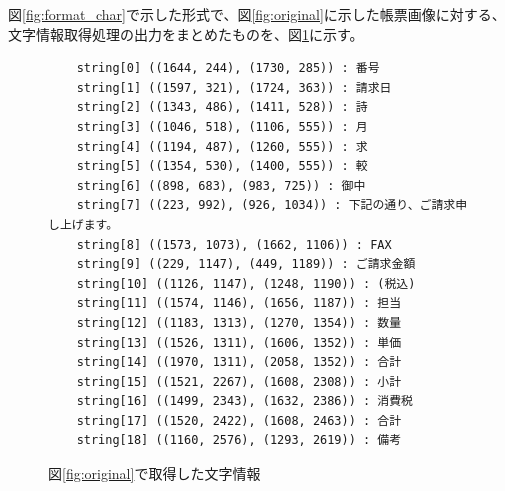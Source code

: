 図\ref{fig:format_char}で示した形式で、図\ref{fig:original}に示した帳票画像に対する、文字情報取得処理の出力をまとめたものを、図\ref{fig:char_recognition_for_original}に示す。
\lstset{language=}
\begin{figure}[tp]
    \begin{lstlisting}
    string[0] ((1644, 244), (1730, 285)) : 番号
    string[1] ((1597, 321), (1724, 363)) : 請求日
    string[2] ((1343, 486), (1411, 528)) : 詩
    string[3] ((1046, 518), (1106, 555)) : 月
    string[4] ((1194, 487), (1260, 555)) : 求
    string[5] ((1354, 530), (1400, 555)) : 較
    string[6] ((898, 683), (983, 725)) : 御中
    string[7] ((223, 992), (926, 1034)) : 下記の通り、ご請求申し上げます。
    string[8] ((1573, 1073), (1662, 1106)) : FAX
    string[9] ((229, 1147), (449, 1189)) : ご請求金額
    string[10] ((1126, 1147), (1248, 1190)) : (税込)
    string[11] ((1574, 1146), (1656, 1187)) : 担当
    string[12] ((1183, 1313), (1270, 1354)) : 数量
    string[13] ((1526, 1311), (1606, 1352)) : 単価
    string[14] ((1970, 1311), (2058, 1352)) : 合計
    string[15] ((1521, 2267), (1608, 2308)) : 小計
    string[16] ((1499, 2343), (1632, 2386)) : 消費税
    string[17] ((1520, 2422), (1608, 2463)) : 合計
    string[18] ((1160, 2576), (1293, 2619)) : 備考
    \end{lstlisting}
    \caption{図\ref{fig:original}で取得した文字情報}
    \label{fig:char_recognition_for_original}
\end{figure}

